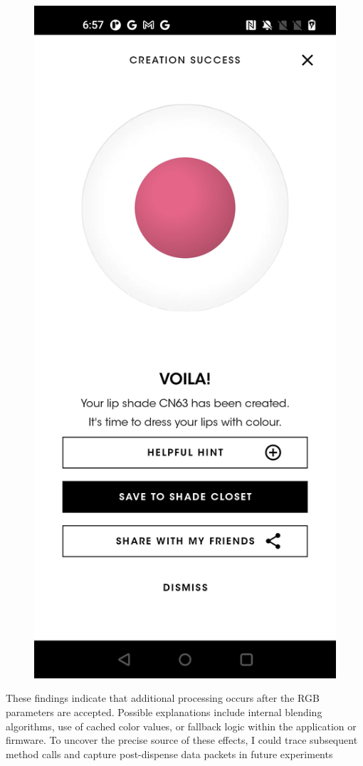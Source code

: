\begin{figure}[H]
	\centering
	\includegraphics[scale=.15]{cn63}
	\caption{}
	\label{fig:cn63}
\end{figure}

These findings indicate that additional processing occurs after the RGB parameters are accepted. Possible explanations include internal blending algorithms, use of cached color values, or fallback logic within the application or firmware. To uncover the precise source of these effects, I could trace subsequent method calls and capture post-dispense data packets in future experiments

